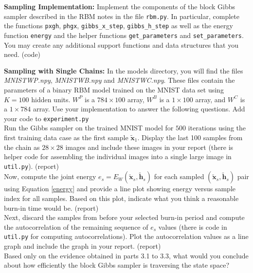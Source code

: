 \documentclass[11pt]{article}
\newcommand{\mbf}[1]{{\mathbf{#1}}}
\begin{document}
\begin{problem}{15} \textbf{Sampling Implementation:} Implement the components of the block Gibbs sampler described in the RBM notes in the file \verb|rbm.py|. In particular, complete the functions \verb|pxgh|, \verb|phgx|, \verb|gibbs_x_step|, \verb|gibbs_h_step|
as well as the energy function \verb|energy| and the helper functions \verb|get_parameters| and \verb|set_parameters|. 	
	 You may create any additional support functions and data structures that you need. (code)
\end{problem}

\begin{problem}{20} \textbf{Sampling with Single Chains:} In the models directory, you will find the files \textit{MNISTWP.npy}, \textit{MNISTWB.npy} and \textit{MNISTWC.npy}. These files contain the parameters of a binary RBM model trained on the MNIST data set using $K=100$ hidden units. $W^P$ is a $784 \times 100$ array,
$W^B$ is a $1\times 100$ array, and $W^C$ is a $1\times 784$ array. Use your implementation  to answer the following questions. Add your code to \verb|experiment.py|\\

  Run the Gibbs sampler on the trained MNIST model for $500$ iterations using the first training data case as the first sample $\tilde{\mbf{x}}_1$. Display the last 100 samples from the chain as $28 \times 28$ images and include these images in your report (there is helper code for assembling the individual images into a single large image in \verb|util.py|). (report)\\

   Now, compute the joint energy $e_s = E_W(\tilde{\mbf{x}}_s,\tilde{\mbf{h}}_s)$ for each sampled $(\tilde{\mbf{x}}_s,\tilde{\mbf{h}}_s)$ pair using Equation \ref{energy} and provide a line plot showing energy versus sample index for all samples. Based on this plot, indicate what you think a reasonable burn-in time would be. (report)\\

  Next, discard the samples from before your selected burn-in period
and compute the autocorrelation of the remaining sequence of $e_s$ values (there is
code in \verb|util.py| for computing autocorrelations). Plot the autocorrelation 
values as a line graph and include the graph in your report. (report)\\

 Based only on the evidence obtained in parts 3.1 to 3.3, what would you conclude about how efficiently the block Gibbs sampler is traversing the state space? 
\end{problem}
\end{document}
